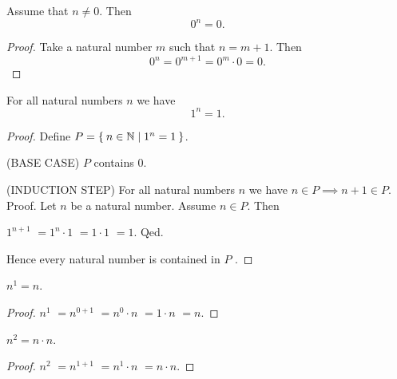 \documentclass[../../natural-numbers.ftl.tex]{subfiles}
\begin{document}
  \begin{forthel}
    \begin{proposition}[NN 01 04 876526]
      Assume that $n \neq 0$.
      Then \[ 0^{n} = 0. \]
    \end{proposition}
    \begin{proof}
      Take a natural number $m$ such that $n = m + 1$.
      Then
      \[
          0^{n}
        = 0^{m + 1}       %
        = 0^{m} \cdot 0   %
        = 0.              %
      \]
    \end{proof}


    \begin{proposition}[NN 01 04 577060]
      For all natural numbers $n$ we have \[ 1^{n} = 1. \]
    \end{proposition}
    \begin{proof}
      Define $P = \Set{n \in \mathbb{N} | 1^{n} = 1}$.

      (BASE CASE) $P$ contains $0$.

      (INDUCTION STEP) For all natural numbers $n$ we have $n \in P \implies n + 1 \in P$. \\
      Proof.
        Let $n$ be a natural number.
        Assume $n \in P$.
        Then

        $  1^{n + 1}$
        $= 1^{n} \cdot 1$   %
        $= 1 \cdot 1$       %
        $= 1$.              %
      Qed.

      Hence every natural number is contained in $P$ .
    \end{proof}


    \begin{proposition}[NN 01 04 848167]
      $n^{1} = n$.
    \end{proposition}
    \begin{proof}
      $  n^{1}$
      $= n^{0 + 1}$       %
      $= n^{0} \cdot n$   %
      $= 1 \cdot n$       %
      $= n$.              %
    \end{proof}


    \begin{proposition}[NN 01 04 846549]
      $n^{2} = n \cdot n$.
    \end{proposition}
    \begin{proof}
      $  n^{2}$
      $= n^{1 + 1}$       %
      $= n^{1} \cdot n$   %
      $= n \cdot n$.      %
    \end{proof}



\end{forthel}
\end{document}
